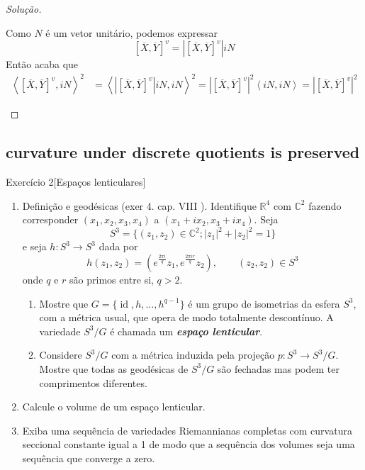 \begin{proof}[Solução]
\begin{enumerate}[label=(\alph*)]
Como \(N\) é um vetor unitário, podemos expressar 
\[\left[ \overline{X},\overline{Y} \right]^v=\left|\left[ \overline{X},\overline{Y} \right]^v\right| i N\]
Então acaba que
\begin{align*}
\left<\left[ \overline{X},\overline{Y} \right]^v, iN\right>^2&=\left<\left|\left[ \overline{X},\overline{Y} \right]^v\right| i N, i N\right>^2=\left|\left[ \overline{X},\overline{Y} \right]^v\right|^2 \left<i N, i N\right>=\left|\left[ \overline{X},\overline{Y} \right]^v\right|^2
\end{align*}
\end{enumerate}
\end{proof}

\subsection{curvature under discrete quotients is preserved}
\begin{thing6}{Exercício 2}[Espaços lenticulares]\label{exer:2}\leavevmode
\begin{enumerate}[label=(\alph*)]
\item Definição e geodésicas (exer 4. cap. VIII \cite{doc}). Identifique \(\mathbb{R}^4\) com \(\mathbb{C}^2\) fazendo corresponder \((x_1,x_2,x_3,x_4)\) a \((x_1+ix_2,x_3+ix_4)\). Seja
	\[S^3=\{(z_1,z_2) \in \mathbb{C}^{2};|z_1|^2+|z_2|^2=1\}\]
	e seja \(h:S^3 \to S^3\) dada por
	\[h(z_1,z_2)=\left(e^{\frac{2\pi i}{q}}z_1,e^{\frac{2\pi i r}{q}}z_2\right) , \qquad  (z_2,z_2) \in S^3\]
	onde \(q \) e \(r\) são primos entre si, \(q>2\).
	\begin{enumerate}[label=(\roman*)]
	\item Mostre que \(G=\{\operatorname{id},h,\ldots, h ^{q-1}\}\) é um grupo de isometrias da esfera \(S^3\), com a métrica usual, que opera de modo totalmente descontínuo. A variedade \(S^3/G\) é chamada um \textit{\textbf{espaço lenticular}}.
	\item Considere \(S^3/G\) com a métrica induzida pela projeção \(p:S^3 \to S^3/G\). Mostre que todas as geodésicas de \(S^3/G\) são fechadas mas podem ter comprimentos diferentes.
	\end{enumerate}
\item Calcule o volume de um espaço lenticular.
\item Exiba uma sequência de variedades Riemannianas completas com curvatura seccional constante igual a 1 de modo que a sequência dos volumes seja uma sequência que converge a zero.

\end{enumerate}
\end{thing6}

